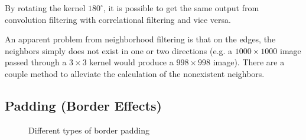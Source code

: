 \documentclass[twoside,a4paper,article]{combine}
\begin{document}
By rotating the kernel $180^\circ$, it is possible to get the same output from convolution filtering with correlational filtering and vice versa\cite{Gonzalez_Woods_2018}.

An apparent problem from neighborhood filtering is that on the edges, the neighbors simply does not exist in one or two directions 
(e.g. a $1000\times1000$ image passed through a $3\times3$ kernel would produce a $998\times998$ image). 
There are a couple method to alleviate the calculation of the nonexistent neighbors.

\subsection{Padding (Border Effects)}

\begin{minipage}{\textwidth}\begin{figure}[H]
    \centering
    \caption{Different types of border padding}
    \label{fig:padding_borders}
\end{figure}\end{minipage}
\end{document}
